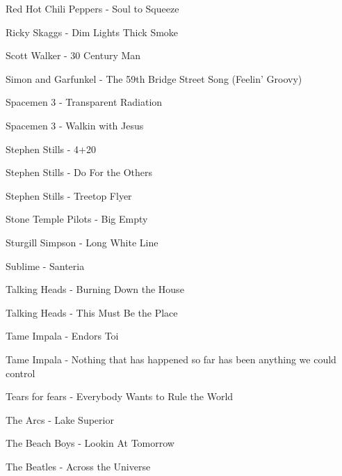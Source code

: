 Red Hot Chili Peppers - Soul to Squeeze \dotfill \pageref{Soul to Squeeze - Red Hot Chili Peppers} 

Ricky Skaggs - Dim Lights Thick Smoke \dotfill \pageref{Dim Lights Thick Smoke - Ricky Skaggs} 

Scott Walker - 30 Century Man \dotfill \pageref{30 Century Man - Scott Walker} 

Simon and Garfunkel - The 59th Bridge Street Song (Feelin' Groovy) \dotfill \pageref{The 59th Bridge Street Song (Feelin' Groovy) - Simon and Garfunkel} 

Spacemen 3 - Transparent Radiation \dotfill \pageref{Transparent Radiation - Spacemen 3} 

Spacemen 3 - Walkin with Jesus \dotfill \pageref{Walkin with Jesus - Spacemen 3} 

Stephen Stills - 4+20 \dotfill \pageref{4+20 - Stephen Stills} 

Stephen Stills - Do For the Others \dotfill \pageref{Do For the Others - Stephen Stills} 

Stephen Stills - Treetop Flyer \dotfill \pageref{Treetop Flyer - Stephen Stills} 

Stone Temple Pilots - Big Empty \dotfill \pageref{Big Empty - Stone Temple Pilots} 

Sturgill Simpson - Long White Line \dotfill \pageref{Long White Line - Sturgill Simpson} 

Sublime - Santeria \dotfill \pageref{Santeria - Sublime} 

Talking Heads - Burning Down the House \dotfill \pageref{Burning Down the House - Talking Heads} 

Talking Heads - This Must Be the Place \dotfill \pageref{This Must Be the Place - Talking Heads} 

Tame Impala - Endors Toi \dotfill \pageref{Endors Toi - Tame Impala} 

Tame Impala - Nothing that has happened so far has been anything we could control \dotfill \pageref{Nothing that has happened so far has been anything we could control - Tame Impala} 

Tears for fears - Everybody Wants to Rule the World \dotfill \pageref{Everybody Wants to Rule the World - Tears for fears} 

The Arcs - Lake Superior \dotfill \pageref{Lake Superior - The Arcs} 

The Beach Boys - Lookin At Tomorrow \dotfill \pageref{Lookin At Tomorrow - The Beach Boys} 

The Beatles - Across the Universe \dotfill \pageref{Across the Universe - The Beatles} 

